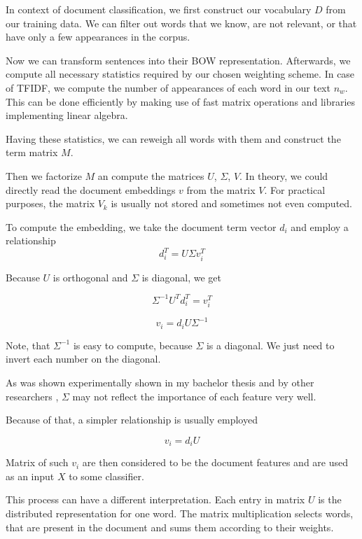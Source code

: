     In context of document classification, we first construct our vocabulary $D$ from our training data. 
    We can filter out words that we know, are not relevant, or that have only a few appearances in the corpus.
    
    Now we can transform sentences into their BOW representation.
    Afterwards, we compute all necessary statistics required by our chosen weighting scheme. 
    In case of TFIDF, we compute the number of appearances of each word in our text $n_w$. 
    This can be done efficiently by making use of fast matrix operations and libraries implementing linear algebra.
    
    Having these statistics, we can reweigh all words with them and construct the term matrix $M$.
    
    Then we factorize $M$ an compute the matrices $U$, $\Sigma$, $V$. 
    In theory, we could directly read the document embeddings $v$ from the matrix $V$.
    For practical purposes, the matrix $V_k$ is usually not stored and sometimes not even computed. 
    
    To compute the embedding, we take the document term vector $d_i$ and employ a relationship $$d_i^T = U \Sigma v_i^T$$
    
    Because $U$ is orthogonal and $\Sigma$ is diagonal, we get
    
    $$\Sigma^{-1} U^T d_i^T = v_i^T $$

    $$v_i = d_i U \Sigma^{-1} $$
    
    Note, that $\Sigma^{-1}$ is easy to compute, because $\Sigma$ is a diagonal. 
    We just need to invert each number on the diagonal.  
    
    As was shown experimentally shown in my bachelor thesis \* %
    and by other researchers \cite{levy2015improving}, $\Sigma$ may not reflect the importance of each feature very well.
    
    Because of that, a simpler relationship is usually employed
    
    $$v_i = d_i U $$
    
    Matrix of such $v_i$ are then considered to be the document features and are used as an input $X$ to some classifier.
    
    This process can have a different interpretation.
    Each entry in matrix $U$ is the distributed representation for one word.
    The matrix multiplication selects words, that are present in the document and sums them according to their weights.
    
